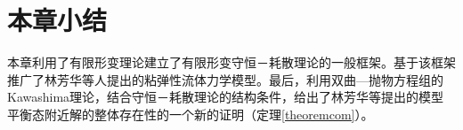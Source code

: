 

\section{本章小结}
本章利用了有限形变理论建立了有限形变守恒－耗散理论的一般框架。基于该框架推广了林芳华等人提出的粘弹性流体力学模型。最后，利用双曲—抛物方程组的Kawashima理论，结合守恒－耗散理论的结构条件，给出了林芳华等提出的模型平衡态附近解的整体存在性的一个新的证明（定理\ref{theoremcom}）。


% 
% 
% 